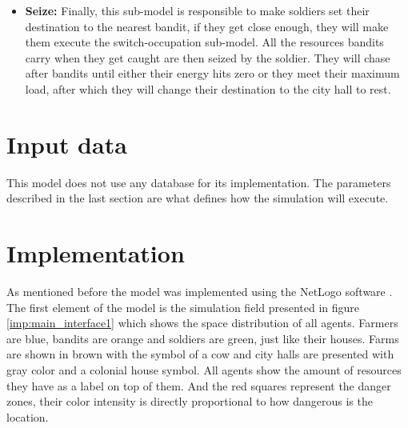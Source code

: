 \documentclass{wscpaperproc}
\begin{document}
\begin{itemize}
    \item \textbf{Seize:} Finally, this sub-model is responsible to make
    soldiers set their destination to the nearest bandit, if they get close
    enough, they will make them execute the switch-occupation sub-model. All
    the resources bandits carry when they get caught are then seized by the
    soldier. They will chase after bandits until either their energy hits zero
    or they meet their maximum load, after which they will change their
    destination to the city hall to rest.

\end{itemize}

\section{Input data}

This model does not use any database for its implementation. The parameters
described in the last section are what defines how the simulation will execute.

\section{Implementation}

As mentioned before the model was implemented using the NetLogo software
\cite{netlogo}. The first element of the model is the simulation field
presented in figure \ref{imp:main_interface1} which shows the space distribution
of all agents. Farmers are blue, bandits are orange and soldiers are
green, just like their houses. Farms are shown in brown with the symbol of a cow
and city halls are presented with gray color and a colonial house symbol. All
agents show the amount of resources they have as a label on top of them. And the
red squares represent the danger zones, their color intensity is directly
proportional to how dangerous is the location.

\newpage
\end{document}
